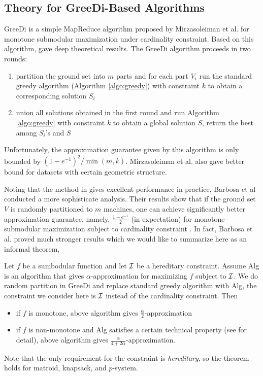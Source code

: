 \subsection{Theory for {\sc GreeDi}-Based Algorithms}
{\sc GreeDi} is a simple MapReduce algorithm proposed by  Mirzasoleiman et al. \cite{MKS+13} for monotone submodular maximization under cardinality constraint. Based on this algorithm, \cite{DEN+15,MZ15} gave deep theoretical results. The {\sc GreeDi} algorithm proceeds in two rounds:
\begin{enumerate}
\item partition the ground set into $m$ parts and for each part $V_i$ run the standard greedy algorithm (Algorithm \ref{algo:greedy}) with constraint $k$ to obtain a corresponding solution $S_i$
\item union all solutions obtained in the first round and run Algorithm \ref{algo:greedy} with constraint $k$ to obtain a global solution $S$, return the best among $S_i$'s and $S$
\end{enumerate}

Unfortunately, the approximation guarantee given by this algorithm is only bounded by $(1 - e^{-1})^2/\min(m, k)$. Mirzasoleiman et al. \cite{MKS+13} also gave better bound for datasets with certain geometric structure.

Noting that the method in \cite{MKS+13} gives excellent performance in practice, Barbosa et al \cite{DEN+15} conducted a more sophisticate analysis. Their results show that if the ground set $V$ is randomly partitioned to $m$ machines, one can achieve significantly better approximation guarantee, namely, $\frac{1 - e^{-1}}{2}$ (in expectation) for monotone submodular maximization subject to cardinality constraint . In fact, Barbosa et al. \cite{DEN+15} proved much stronger results which we would like to summarize here as an informal theorem,
\begin{theorem}
  \label{thm:randomGreeDi}
  Let $f$ be a sumbodular function and let $\mathcal{I}$ be a hereditary constraint. Assume {\sc Alg} is an algorithm that gives $\alpha$-approximation for maximizing $f$ subject to $\mathcal{I}$. We do random partition in {\sc GreeDi} and replace standard greedy algorithm with {\sc Alg}, the constraint we consider here is $\mathcal{I}$ instead of the cardinality constraint. Then 
  \begin{itemize}
  \item if $f$ is monotone, above algorithm gives $\frac{\alpha}{2}$-approximation
  \item if $f$ is non-monotone and {\sc Alg} satisfies a certain technical property (see \cite{DEN+15} for detail), above algorithm gives $\frac{\alpha}{4 + 2\alpha}$-approximation.
  \end{itemize}
\end{theorem}
Note that the only requirement for the constraint is \emph{hereditary}, so the theorem holds for matroid, knapsack, and $p$-system.
 


